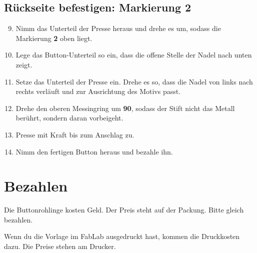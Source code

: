 \documentclass{\basedir/fablab-document}
\begin{document}
\subsection{Rückseite befestigen: Markierung 2}
\begin{enumerate}
\setcounter{enumi}{8}
 \item Nimm das Unterteil der Presse heraus und drehe es um, sodass die Markierung \textbf{2} oben liegt.
 \item Lege das Button-Unterteil so ein, dass die offene Stelle der Nadel nach unten zeigt.
 \item Setze das Unterteil der Presse ein. Drehe es so, dass die Nadel von links nach rechts verläuft und zur Ausrichtung des Motivs passt.
 \item Drehe den oberen Messingring um \textbf{90\textdegree{}}, sodass der Stift nicht das Metall berührt, sondern daran vorbeigeht.
 \item Presse mit Kraft bis zum Anschlag zu.
 \item Nimm den fertigen Button heraus und bezahle ihn.
\end{enumerate}

\section{Bezahlen}
Die Buttonrohlinge kosten Geld. Der Preis steht auf der Packung. Bitte gleich bezahlen.

Wenn du die Vorlage im FabLab ausgedruckt hast, kommen die Druckkosten dazu.
Die Preise stehen am Drucker.

\clearpage
{}
\end{document}
